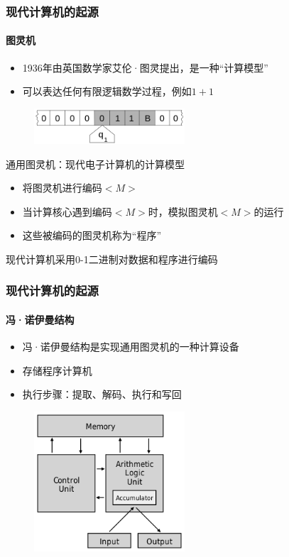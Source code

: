 \documentclass[10pt]{beamer}
\begin{document}
\begin{frame}
\frametitle{现代计算机的起源}
\framesubtitle{图灵机}
\begin{itemize}
    \item 1936年由英国数学家艾伦·图灵提出，是一种“计算模型”
    \item 可以表达任何有限逻辑数学过程，例如$1+1$
\end{itemize}
\begin{figure}
    \centering
    \includegraphics[width=0.5\textwidth]{figures/tuling.png}    
\end{figure}

\begin{block}{通用图灵机：现代电子计算机的计算模型}
    \begin{itemize}
        \item 将图灵机进行编码$<M>$
        \item 当计算核心遇到编码$<M>$时，模拟图灵机$<M>$的运行
        \item 这些被编码的图灵机称为“程序”
    \end{itemize}
\end{block}
现代计算机采用0-1二进制对数据和程序进行编码

\end{frame}

\begin{frame}
\frametitle{现代计算机的起源}
\framesubtitle{冯·诺伊曼结构}

\begin{itemize}
    \item 冯·诺伊曼结构是实现通用图灵机的一种计算设备
    \item 存储程序计算机
    \item 执行步骤：提取、解码、执行和写回
\end{itemize}

\begin{figure}
    \centering
    \includegraphics[width=0.5\textwidth]{figures/Von_Neumann_architecture..png}
\end{figure}

\end{frame}
\end{document}
